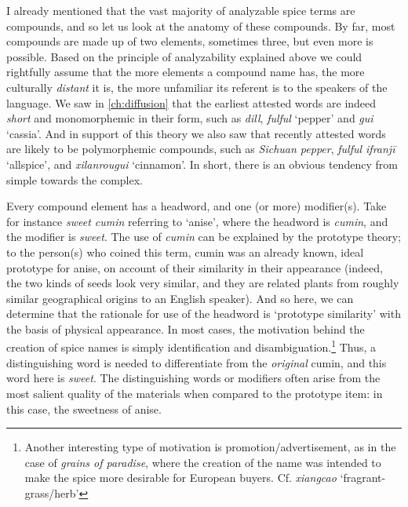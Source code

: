 I already mentioned that the vast majority of analyzable spice terms are compounds, and so let us look at the anatomy of these compounds. By far, most compounds are made up of two elements, sometimes three, but even more is possible. Based on the principle of analyzability explained above we could rightfully assume that the more elements a compound name has, the more culturally \textit{distant} it is, the more unfamiliar its referent is to the speakers of the language. We saw in \cref{ch:diffusion} that the earliest attested words are indeed \textit{short} and monomorphemic in their form, such as \textit{dill}, \textit{fulful} `pepper' and \textit{gui} `cassia'. And in support of this theory we also saw that recently attested words are likely to be polymorphemic compounds, such as \textit{Sichuan pepper}, \textit{fulful ifranjī} `allspice', and \textit{xilanrougui} `cinnamon'. In short, there is an obvious tendency from simple towards the complex.

Every compound element has a headword, and one (or more) modifier(s). Take for instance \textit{sweet cumin} referring to `anise', where the headword is \textit{cumin}, and the modifier is \textit{sweet}. The use of \textit{cumin} can be explained by the prototype theory; to the person(s) who coined this term, cumin was an already known, ideal prototype for anise, on account of their similarity in their appearance (indeed, the two kinds of seeds look very similar, and they are related plants from roughly similar geographical origins to an English speaker). And so here, we can determine that the rationale for use of the headword is `prototype similarity' with the basis of physical appearance. In most cases, the motivation behind the creation of spice names is simply identification and disambiguation.\footnote{Another interesting type of motivation is promotion/advertisement, as in the case of \textit{grains of paradise}, where the creation of the name was intended to make the spice more desirable for European buyers. Cf. \textit{xiangcao} `fragrant-grass/herb'} Thus, a distinguishing word is needed to differentiate from the \textit{original} cumin, and this word here is \textit{sweet}. The distinguishing words or modifiers often arise from the most salient quality of the materials when compared to the prototype item: in this case, the sweetness of anise.

